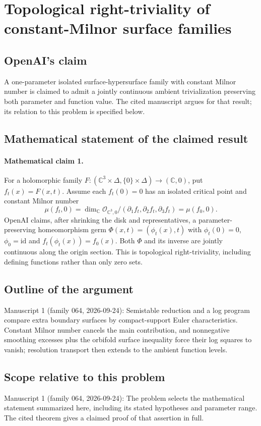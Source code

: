 \documentclass[11pt]{article}
\begin{document}
\section*{Topological right-triviality of constant-Milnor surface families}

\subsection{OpenAI's claim}
A one-parameter isolated surface-hypersurface family with constant Milnor number is claimed to admit a jointly continuous ambient trivialization preserving both parameter and function value. The cited manuscript argues for that result; its relation to this problem is specified below.

\subsection{Mathematical statement of the claimed result}
\paragraph{Mathematical claim 1.} For a holomorphic family $F:(\mathbb C^3\times\Delta,\{0\}\times\Delta)\to(\mathbb C,0)$, put $f_t(x)=F(x,t)$. Assume each $f_t(0)=0$ has an isolated critical point and constant Milnor number
\[
\mu(f_t,0)=\dim_{\mathbb C}\mathcal O_{\mathbb C^3,0}/(\partial_1f_t,\partial_2f_t,\partial_3f_t)=\mu(f_0,0).
\]
OpenAI claims, after shrinking the disk and representatives, a parameter-preserving homeomorphism germ $\Phi(x,t)=(\phi_t(x),t)$ with $\phi_t(0)=0$, $\phi_0=\mathrm{id}$ and $f_t(\phi_t(x))=f_0(x)$. Both $\Phi$ and its inverse are jointly continuous along the origin section. This is topological right-triviality, including defining functions rather than only zero sets.

\subsection{Outline of the argument}
Manuscript 1 (family 064, 2026-09-24): Semistable reduction and a log program compare extra boundary surfaces by compact-support Euler characteristics. Constant Milnor number cancels the main contribution, and nonnegative smoothing excesses plus the orbifold surface inequality force their log squares to vanish; resolution transport then extends to the ambient function levels.

\subsection{Scope relative to this problem}
Manuscript 1 (family 064, 2026-09-24): The problem selects the mathematical statement summarized here, including its stated hypotheses and parameter range. The cited theorem gives a claimed proof of that assertion in full.
\end{document}
